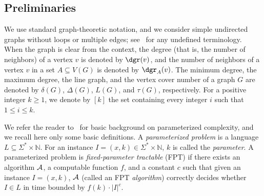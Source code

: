 

\subsection{Preliminaries}
\label{sec:prelim_}

We use standard graph-theoretic notation, and we consider simple undirected graphs without loops or multiple edges; see~\cite{Die10} for any undefined terminology. When the graph is clear from the context, the degree (that is, the number of neighbors) of a vertex $v$ is denoted by  $\dgr(v)$, and the number of neighbors of a vertex $v$ in a set $A \subseteq V(G)$ is denoted by $\dgr_A(v)$. The minimum degree, the maximum degree, the line graph, and the vertex cover number of a graph $G$ are denoted by $\delta(G)$, $\Delta(G)$, $L(G)$,
and $\tau(G)$, respectively. For a positive integer $k \geq 1$, we denote by $[k]$ the set containing every integer $i$ such that $1 \leq i \leq k$.


We refer the reader to~\cite{DF13,CyganFKLMPPS15} for basic background on parameterized complexity, and we recall here only some basic definitions.
A \emph{parameterized problem} is a language $L \subseteq \Sigma^* \times \mathbb{N}$.  For an instance $I=(x,k) \in \Sigma^* \times \mathbb{N}$, $k$ is called the \emph{parameter}. %
A parameterized problem is \emph{fixed-parameter tractable} ({\sf FPT}) if there exists an algorithm $\mathcal{A}$, a computable function $f$, and a constant $c$ such that given an instance $I=(x,k)$,
$\mathcal{A}$ (called an {\sf FPT} \emph{algorithm}) correctly decides whether $I \in L$ in time bounded by $f(k) \cdot |I|^c$.

